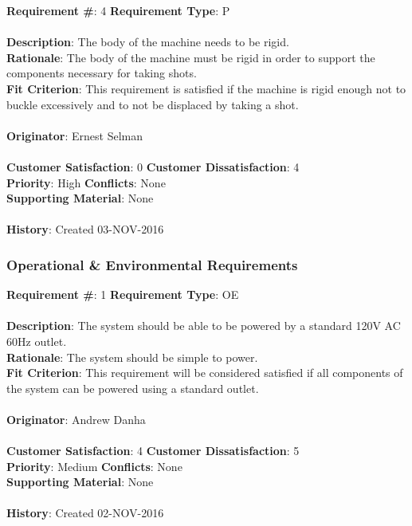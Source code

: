 \documentclass[titlepage]{article}
\begin{document}
\begin{framed}
	\noindent\textbf{Requirement \#}: 4 \hfill \textbf{Requirement Type}: P \hfill\\\\
	\noindent\textbf{Description}: The body of the machine needs to be rigid. \\
	\textbf{Rationale}: The body of the machine must be rigid in order to support the components necessary for taking shots.\\
	\textbf{Fit Criterion}: This requirement is satisfied if the machine is rigid enough not to buckle excessively and to not be displaced by taking a shot.\\\\
	\textbf{Originator}: Ernest Selman\\\\
	\noindent\textbf{Customer Satisfaction}: 0 \hfill 	\textbf{Customer Dissatisfaction}: 4 \hfill\\
	\textbf{Priority}: High \hfill \textbf{Conflicts}: None \hfill\\
	\textbf{Supporting Material}: None\\\\
	\noindent\textbf{History}: Created 03-NOV-2016
\end{framed}

\newpage
\subsubsection{Operational \& Environmental Requirements}
\begin{framed}
	\noindent\textbf{Requirement \#}: 1 \hfill \textbf{Requirement Type}: OE \hfill\\\\
	\noindent\textbf{Description}: The system should be able to be powered by a standard 120V AC 60Hz outlet.\\
	\textbf{Rationale}: The system should be simple to power.\\
	\textbf{Fit Criterion}: This requirement will be considered satisfied if all components of the system can be powered using a standard outlet.\\\\
	\textbf{Originator}: Andrew Danha\\\\
	\noindent\textbf{Customer Satisfaction}: 4 \hfill 	\textbf{Customer Dissatisfaction}: 5 \hfill\\
	\textbf{Priority}: Medium \hfill \textbf{Conflicts}: None \hfill\\
	\textbf{Supporting Material}: None\\\\
	\noindent\textbf{History}: Created 02-NOV-2016
\end{framed}
\end{document}
